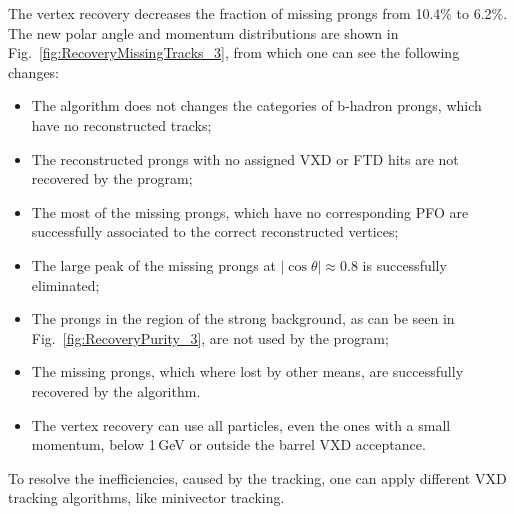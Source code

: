 The vertex recovery decreases the fraction of missing prongs from 10.4\% to 6.2\%. The new polar angle and momentum distributions are shown in Fig.~\ref{fig:RecoveryMissingTracks_3}, from which one can see the following changes:
\begin{itemize}
\item The algorithm does not changes the categories of b-hadron prongs, which have no reconstructed tracks;
\item The reconstructed prongs with no assigned VXD or FTD hits are not recovered by the program;
\item The most of the missing prongs, which have no corresponding PFO are successfully associated to the correct reconstructed vertices;
\item The large peak of the missing prongs at $|\cos\theta| \approx 0.8$ is successfully eliminated;
\item The prongs in the region of the strong background, as can be seen in Fig.~\ref{fig:RecoveryPurity_3}, are not used by the program;
\item The missing prongs, which where lost by other means, are successfully recovered by the algorithm.
\item The vertex recovery can use all particles, even the ones with a small momentum, below 1\,GeV or outside the barrel VXD acceptance. 
\end{itemize}

To resolve the inefficiencies, caused by the tracking, one can apply different VXD tracking algorithms, like minivector tracking. 

